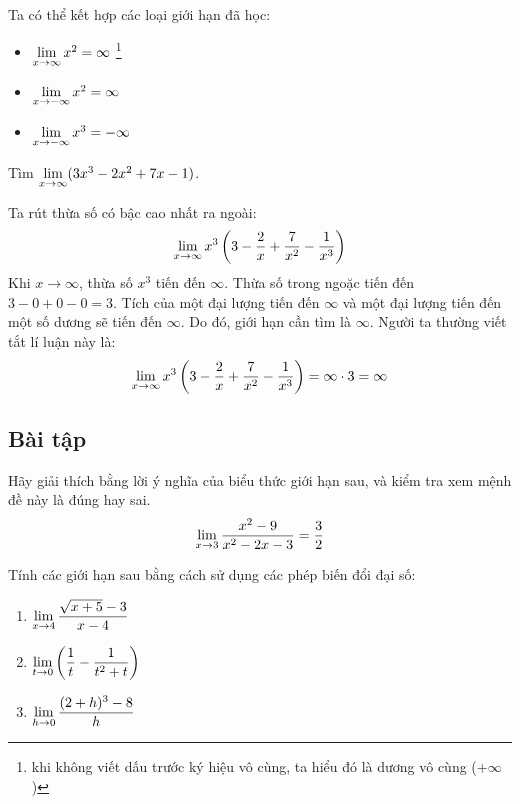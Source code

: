 \begin{example}
    Ta có thể kết hợp các loại giới hạn đã học:
    \begin{itemize}
        \item $\lim\limits_{x \to \infty} x^2 = \infty$ \footnote{khi không viết dấu trước ký hiệu vô cùng, ta hiểu đó là dương vô cùng ($+\infty$)}
        \item $\lim\limits_{x \to -\infty} x^2 = \infty$
        \item $\lim\limits_{x \to -\infty} x^3 = -\infty$
    \end{itemize}
\end{example}

\begin{example}
    Tìm $\lim\limits_{x \to \infty} (3x^3 - 2x^2 + 7x - 1)$.
    
    Ta rút thừa số có bậc cao nhất ra ngoài:
    \begin{equation*}
        \lim\limits_{x \to \infty} x^3 \left(3 - \dfrac{2}{x} + \dfrac{7}{x^2} - \dfrac{1}{x^3}\right)
    \end{equation*}
    Khi $x \to \infty$, thừa số $x^3$ tiến đến $\infty$. Thừa số trong ngoặc tiến đến $3 - 0 + 0 - 0 = 3$.
    Tích của một đại lượng tiến đến $\infty$ và một đại lượng tiến đến một số dương sẽ tiến đến $\infty$. Do đó, giới hạn cần tìm là $\infty$. Người ta thường viết tắt lí luận này là:
    \begin{equation*}
         \lim\limits_{x \to \infty} x^3 \left(3 - \dfrac{2}{x} + \dfrac{7}{x^2} - \dfrac{1}{x^3}\right) = \infty \cdot 3 = \infty
    \end{equation*}
\end{example}


\subsection{Bài tập}

\begin{exercise}
    Hãy giải thích bằng lời ý nghĩa của biểu thức giới hạn sau, và kiểm tra xem mệnh đề này là đúng hay sai.
    \begin{equation*}
        \lim\limits_{x \to 3} \dfrac{x^2 - 9}{x^2 - 2x - 3} = \dfrac{3}{2}
    \end{equation*}
\end{exercise}
    
\begin{exercise}
    Tính các giới hạn sau bằng cách sử dụng các phép biến đổi đại số:
    \begin{enumerate}[label=(\alph*)]
        \item $\lim\limits_{x \to 4} \dfrac{\sqrt{x+5} - 3}{x-4}$
        \item $\lim\limits_{t \to 0} \left( \dfrac{1}{t} - \dfrac{1}{t^2+t} \right)$
        \item $\lim\limits_{h \to 0} \dfrac{(2+h)^3 - 8}{h}$
    \end{enumerate}
\end{exercise}

